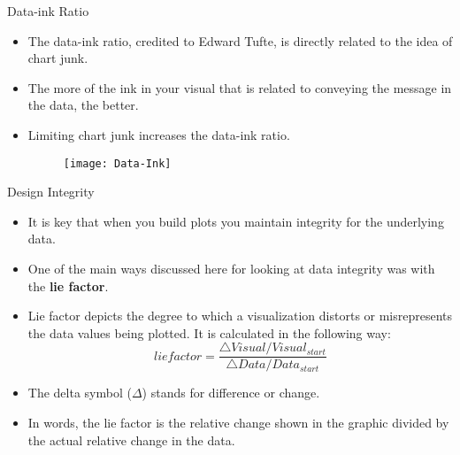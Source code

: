 \documentclass[12pt]{beamer}
\begin{document}
    \begin{frame}{Data-ink Ratio}
    	\begin{itemize}
    		\item The data-ink ratio, credited to Edward Tufte, is directly related to the idea of chart junk. 
    		\item The more of the ink in your visual that is related to conveying the message in the data, the better.
    		\item Limiting chart junk increases the data-ink ratio.
    		\begin{figure}
    			\centering
    			\texttt{[image: Data-Ink]}
    		\end{figure}
    	\end{itemize}
    \end{frame}
    \begin{frame}{Design Integrity}
    	\begin{itemize}
    		\item It is key that when you build plots you maintain integrity for the underlying data.
    		\item One of the main ways discussed here for looking at data integrity was with the \textbf{lie factor}.
    		\item Lie factor depicts the degree to which a visualization distorts or misrepresents the data values being plotted. It is calculated in the following way:
    		\begin{equation}
    			lie factor = \dfrac{\bigtriangleup Visual / Visual_{start}}{\bigtriangleup Data / Data_{start}}
    		\end{equation}
    	    \item The delta symbol ($\Delta$) stands for difference or change.
    	    \item In words, the lie factor is the relative change shown in the graphic divided by the actual relative change in the data.
    	\end{itemize}
    \end{frame}
\end{document}
